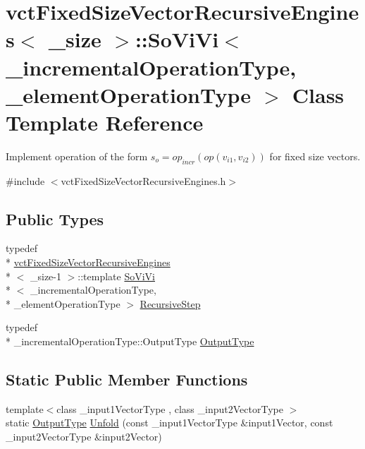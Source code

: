 \hypertarget{classvct_fixed_size_vector_recursive_engines_1_1_so_vi_vi}{\section{vct\-Fixed\-Size\-Vector\-Recursive\-Engines$<$ \-\_\-size $>$\-:\-:So\-Vi\-Vi$<$ \-\_\-incremental\-Operation\-Type, \-\_\-element\-Operation\-Type $>$ Class Template Reference}
\label{classvct_fixed_size_vector_recursive_engines_1_1_so_vi_vi}
}


Implement operation of the form $s_o = op_{incr}(op(v_{i1}, v_{i2}))$ for fixed size vectors.  




{\ttfamily \#include $<$vct\-Fixed\-Size\-Vector\-Recursive\-Engines.\-h$>$}

\subsection*{Public Types}
\begin{DoxyCompactItemize}
\item 
typedef \\*
\hyperlink{classvct_fixed_size_vector_recursive_engines}{vct\-Fixed\-Size\-Vector\-Recursive\-Engines}\\*
$<$ \-\_\-size-\/1 $>$\-::template \hyperlink{classvct_fixed_size_vector_recursive_engines_1_1_so_vi_vi}{So\-Vi\-Vi}\\*
$<$ \-\_\-incremental\-Operation\-Type, \\*
\-\_\-element\-Operation\-Type $>$ \hyperlink{classvct_fixed_size_vector_recursive_engines_1_1_so_vi_vi_a75d4db74016f41d3bd1888e53f95f819}{Recursive\-Step}
\item 
typedef \\*
\-\_\-incremental\-Operation\-Type\-::\-Output\-Type \hyperlink{classvct_fixed_size_vector_recursive_engines_1_1_so_vi_vi_a6d0b7f027e001b57489dcc1314ea016e}{Output\-Type}
\end{DoxyCompactItemize}
\subsection*{Static Public Member Functions}
\begin{DoxyCompactItemize}
\item 
{\footnotesize template$<$class \-\_\-input1\-Vector\-Type , class \-\_\-input2\-Vector\-Type $>$ }\\static \hyperlink{classvct_fixed_size_vector_recursive_engines_1_1_so_vi_vi_a6d0b7f027e001b57489dcc1314ea016e}{Output\-Type} \hyperlink{classvct_fixed_size_vector_recursive_engines_1_1_so_vi_vi_a0703aa041b0662462569c1a70b7ceff9}{Unfold} (const \-\_\-input1\-Vector\-Type \&input1\-Vector, const \-\_\-input2\-Vector\-Type \&input2\-Vector)
\end{DoxyCompactItemize}


